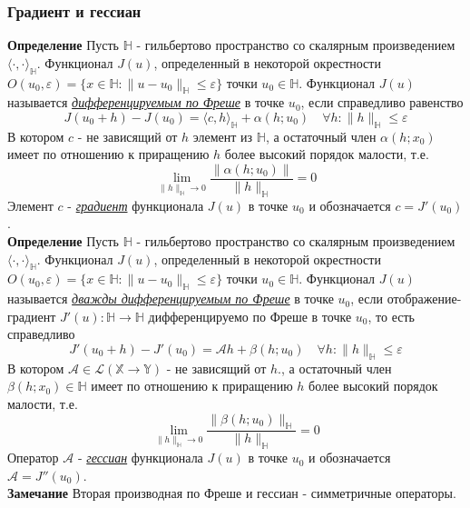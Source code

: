 \documentclass[A4]{article}
\begin{document}
 \subsubsection{Градиент и гессиан}
 \textbf{Определение} Пусть $\mathbb{H}$ - гильбертово пространство со скалярным произведением $\langle\cdot,\cdot\rangle_{\mathbb{H}}$. Функционал $J(u)$, определенный в некоторой окрестности $O(u_0,\varepsilon) =\{x\in\mathbb{H}:\|u-u_0\|_{\mathbb{H}}\leqslant\varepsilon\}$ точки $u_0\in\mathbb{H}$. Функционал $J(u)$ называется \underline{\emph{дифференцируемым по Фреше}} в точке $u_0$, если справедливо равенство
 \begin{equation*}
J(u_0+h)-J(u_0)=\langle c,h\rangle_{\mathbb{H}}+\alpha(h;u_0)\quad\forall h:\|h\|_{\mathbb{H}}\leqslant\varepsilon
 \end{equation*}
 В котором $c$ - не зависящий от $h$ элемент из $\mathbb{H}$, а остаточный член $\alpha(h;x_0)$ имеет по отношению к приращению $h$ более высокий порядок малости, т.е.
 \begin{equation*}
 \lim_{\|h\|_{\mathbb{H}}\rightarrow 0} \frac{\|\alpha(h;u_0)\|}{\|h\|_{\mathbb{H}}}=0
 \end{equation*}
Элемент $c$ - \underline{\emph{градиент}} функционала $J(u)$ в точке $u_0$ и обозначается $c=J'(u_0)$.\\
\textbf{Определение} Пусть $\mathbb{H}$ - гильбертово пространство со скалярным произведением $\langle\cdot,\cdot\rangle_{\mathbb{H}}$. Функционал $J(u)$, определенный в некоторой окрестности $O(u_0,\varepsilon) =\{x\in\mathbb{H}:\|u-u_0\|_{\mathbb{H}}\leqslant\varepsilon\}$ точки $u_0\in\mathbb{H}$. Функционал $J(u)$ называется \underline{\emph{дважды дифференцируемым по Фреше}} в точке $u_0$, если отображение-градиент $J'(u):\mathbb{H}\rightarrow\mathbb{H}$ дифференцируемо по Фреше в точке $u_0$, то есть справедливо
\begin{equation*}
J'(u_0+h)-J'(u_0)=\mathcal{A}h+\beta(h;u_0)\quad\forall h:\|h\|_{\mathbb{H}}\leqslant\varepsilon
\end{equation*}
В котором $\mathcal{A}\in\mathcal{L}(\mathbb{X}\rightarrow\mathbb{Y})$ - не зависящий от $h$., а остаточный член $\beta(h;x_0)\in\mathbb{H}$ имеет по отношению к приращению $h$ более высокий порядок малости, т.е.
\begin{equation*}
\lim_{\|h\|_{\mathbb{H}}\rightarrow 0} \frac{\|\beta(h;u_0)\|_{\mathbb{H}}}{\|h\|_{\mathbb{H}}}=0
\end{equation*}
Оператор $\mathcal{A}$ - \underline{\emph{гессиан}} функционала $J(u)$ в точке $u_0$ и обозначается $\mathcal{A}=J''(u_0)$.\\
\textbf{Замечание} Вторая производная по Фреше и гессиан - симметричные операторы.
\end{document}
